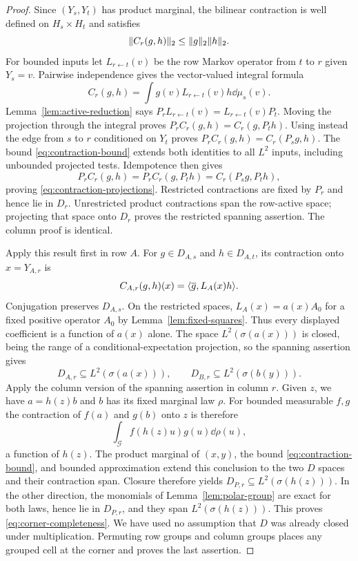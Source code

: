 \begin{proof}
Since $(Y_s,Y_t)$ has product marginal, the bilinear contraction is
well defined on $H_s\times H_t$ and satisfies
\begin{equation}\label{eq:contraction-bound}
 \lVert C_r(g,h)\rVert_2\le\lVert g\rVert_2\lVert h\rVert_2.
\end{equation}
For bounded inputs let $L_{r\leftarrow t}(v)$ be the row Markov operator
from $t$ to $r$ given $Y_s=v$.  Pairwise independence gives the
vector-valued integral formula
\[
 C_r(g,h)=\int g(v)L_{r\leftarrow t}(v)h\dd\mu_s(v).
\]
Lemma~\ref{lem:active-reduction} says
$P_rL_{r\leftarrow t}(v)=L_{r\leftarrow t}(v)P_t$.
Moving the projection through the integral proves
$P_rC_r(g,h)=C_r(g,P_th)$.
Using instead the edge from $s$ to $r$ conditioned on $Y_t$ proves
$P_rC_r(g,h)=C_r(P_sg,h)$.
The bound \eqref{eq:contraction-bound} extends both identities to all
$L^2$ inputs, including unbounded projected tests.  Idempotence then gives
\[
 P_rC_r(g,h)=P_rC_r(g,P_th)=C_r(P_sg,P_th),
\]
proving \eqref{eq:contraction-projections}.  Restricted contractions are
fixed by $P_r$ and hence lie in $D_r$.  Unrestricted product contractions
span the row-active space; projecting that space onto $D_r$ proves the
restricted spanning assertion.  The column proof is identical.

Apply this result first in row $A$.  For $g\in D_{A,s}$ and
$h\in D_{A,t}$, its contraction onto $x=Y_{A,r}$ is
\[
 C_{A,r}(g,h)(x)=\langle \overline g,L_A(x)h\rangle.
\]
Conjugation preserves $D_{A,s}$.  On the restricted spaces,
$L_A(x)=a(x)A_0$ for a fixed positive operator $A_0$ by
Lemma~\ref{lem:fixed-squares}.  Thus every displayed coefficient is a
function of $a(x)$ alone.  The space $L^2(\sigma(a(x)))$ is closed,
being the range of a conditional-expectation projection, so the spanning
assertion gives
\[
 D_{A,r}\subseteq L^2(\sigma(a(x))),\qquad
 D_{B,r}\subseteq L^2(\sigma(b(y))).
\]
Apply the column version of the spanning assertion in column $r$.
Given $z$, we have $a=h(z)b$ and $b$ has its fixed marginal law $\rho$.
For bounded measurable $f,g$ the contraction of $f(a)$ and $g(b)$ onto
$z$ is therefore
\[
 \int_{\mathcal G} f(h(z)u)g(u)\dd\rho(u),
\]
a function of $h(z)$.  The product marginal of $(x,y)$, the bound
\eqref{eq:contraction-bound}, and bounded approximation extend this
conclusion to the two $D$ spaces and their contraction span.  Closure
therefore yields $D_{P,r}\subseteq L^2(\sigma(h(z)))$.
In the other direction, the monomials of
Lemma~\ref{lem:polar-group} are exact for both laws, hence lie in
$D_{P,r}$, and they span $L^2(\sigma(h(z)))$.
This proves \eqref{eq:corner-completeness}.  We have used no assumption
that $D$ was already closed under multiplication.  Permuting row groups
and column groups places any grouped cell at the corner and proves the
last assertion.
\end{proof}

